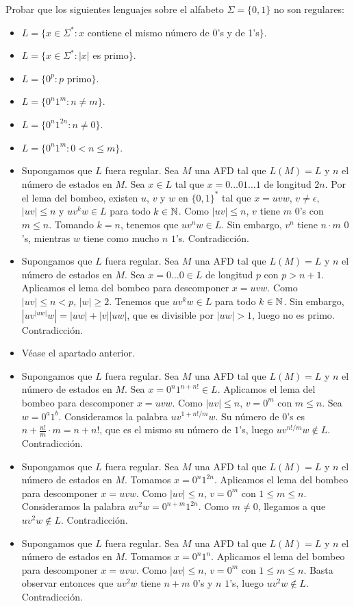 \documentclass[twoside]{article}
\begin{document}
\begin{ejercicio}{17}
Probar que los siguientes lenguajes sobre el alfabeto $Σ = \{0, 1\}$ no son regulares:
\begin{itemize}
\item $L = \{x ∈ Σ^*
: x$ contiene el mismo número de 0’s y de 1’s$\}$.

\item $L = \{x ∈ Σ^*
: |x|$ es primo$\}$.
\item $L = \{0^p
: p$ primo$\}$.
\item $L = \{0^n1^m : n \neq m\}$.
\item $L = \{0^n1^{2n}
: n \neq 0\}$.
\item $L = \{0^n1^m : 0 < n ≤ m\}$.
\end{itemize}
\end{ejercicio}
\begin{solucion}\mbox{}
\begin{itemize}
	\item Supongamos que $L$ fuera regular. Sea $M$ una AFD tal que $L(M)=L$ y $n$ el número de estados en $M$. Sea $x \in L$ tal que $x=0\dots01\dots1$ de longitud $2n$. Por el lema del bombeo, existen $u$, $v$ y $w$ en $\{0,1\}^*$ tal que $x=uvw$, $v \neq ϵ$, $|uv|≤n$ y $uv^kw \in L$ para todo $k \in \mathbb{N}$. Como $|uv|≤n$, $v$ tiene $m$ $0$'s con $m ≤ n$. Tomando $k=n$, tenemos que $uv^nw \in L$. Sin embargo, $v^n$ tiene $n\cdot m$ $0$'s, mientras $w$ tiene como mucho $n$ $1$'s. Contradicción.
	\item Supongamos que $L$ fuera regular. Sea $M$ una AFD tal que $L(M)=L$ y $n$ el número de estados en $M$. Sea $x=0\dots0\in L$ de longitud $p$ con $p > n+1$. Aplicamos el lema del bombeo para descomponer $x=uvw$. Como $|uv| ≤ n < p$, $|w|≥2$. Tenemos que $uv^kw \in L$ para todo $k \in \mathbb{N}$. Sin embargo, $|uv^{|uw|}w|=|uw|+|v||uw|$, que es divisible por $|uw|>1$, luego no es primo. Contradicción.
	\item Véase el apartado anterior.
	\item Supongamos que $L$ fuera regular. Sea $M$ una AFD tal que $L(M)=L$ y $n$ el número de estados en $M$. Sea $x=0^n1^{n+n!}\in L$. Aplicamos el lema del bombeo para descomponer $x=uvw$. Como $|uv|≤n$, $v=0^m$ con $m≤n$. Sea $w=0^a1^b$. Consideramos la palabra $uv^{1+n!/m}w$. Su número de $0$'s es $n+\frac{n!}{m}\cdot m=n+n!$, que es el mismo su número de $1$'s, luego $uv^{n!/m}w \notin L$. Contradicción.
	\item Supongamos que $L$ fuera regular. Sea $M$ una AFD tal que $L(M)=L$ y $n$ el número de estados en $M$. Tomamos $x=0^{n}1^{2n}$. Aplicamos el lema del bombeo para descomponer $x=uvw$. Como $|uv|≤n$, $v=0^m$ con $1≤m≤n$. Consideramos la palabra $uv^2w=0^{n+m}1^{2n}$. Como $m \neq 0$, llegamos a que $uv^2w \notin L$. Contradicción.
	\item Supongamos que $L$ fuera regular. Sea $M$ una AFD tal que $L(M)=L$ y $n$ el número de estados en $M$. Tomamos $x=0^n1^n$. Aplicamos el lema del bombeo para descomponer $x=uvw$. Como $|uv|≤n$, $v=0^m$ con $1≤m≤n$. Basta observar entonces que $uv^2w$ tiene $n+m$ $0$'s y $n$ $1$'s, luego $uv^2w \notin L$. Contradicción.
\end{itemize}
\end{solucion}
\end{document}
